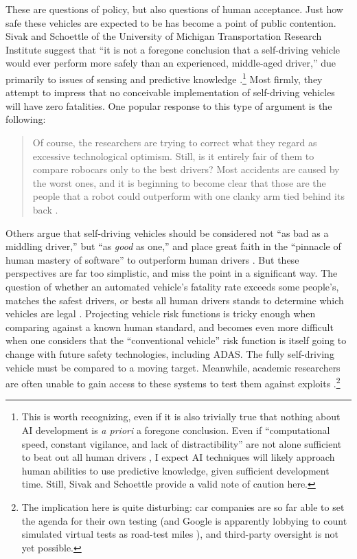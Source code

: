 These are questions of
  policy, but also questions of human acceptance. Just how safe these
  vehicles are expected to be has become a point of 
public contention. Sivak and Schoettle of the
University of Michigan Transportation Research Institute suggest that
``it is not a foregone conclusion that a 
self-driving vehicle would ever perform more safely than an
experienced, middle-aged driver,'' due primarily to issues of sensing and
predictive knowledge \cite[p. 7]{SivakSchoettle}.\footnote{This is worth
recognizing, even if it is also trivially true that nothing about AI
development is \emph{a priori} a foregone conclusion. Even if
``computational speed, constant vigilance, and lack of 
distractibility'' are not alone sufficient to beat out all human
drivers \cite[p. 4]{SivakSchoettle}, I expect AI techniques will
likely approach human 
abilities to use predictive 
knowledge, given sufficient development time. Still, Sivak and
Schoettle provide a valid note of caution here.} Most firmly, they
attempt to impress that no conceivable implementation of self-driving
vehicles will have zero fatalities. One popular response to this type of
argument is the following: 
\begin{quote}Of course, the researchers are trying to correct what they regard as
excessive technological optimism. Still, is it entirely fair of them
to compare robocars only to the best drivers? Most accidents are
caused by the worst ones, and it is beginning to become clear that
those are the people that a robot could outperform with one clanky
arm tied behind its back \cite{rossSafety}.\end{quote} 
Others argue that self-driving vehicles should be considered not ``as
bad as a middling 
driver,'' but ``as \emph{good} as one,'' and place great faith in the
``pinnacle of human mastery of software'' to outperform human drivers \cite{templetonB}.
But these perspectives are far too simplistic, and miss the point in a
significant way. The question of whether an
automated vehicle's fatality rate exceeds some people's, matches the
safest drivers, or bests all human drivers stands to determine which
vehicles are legal \cite[p. 6]{SivakSchoettle}. Projecting vehicle
risk functions is tricky enough when comparing against a known human
standard, and becomes even more difficult when one considers that the
``conventional vehicle'' risk function is itself going to change with
future safety technologies, including ADAS. The fully self-driving
vehicle must be compared to a moving 
target. Meanwhile, academic researchers are often unable to gain access to
these systems to test them against exploits
\cite{madrigalHack}.\footnote{The
implication here is quite disturbing: car companies are so far able to
set the agenda for their own testing (and Google is apparently
lobbying to count simulated virtual tests as road-test miles
\cite{harrisVirtual}),
and third-party oversight is not yet possible.}

